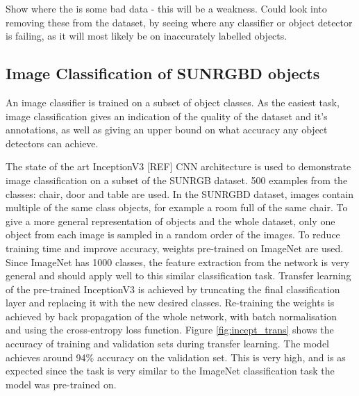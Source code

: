 \documentclass[11pt]{article}
\begin{document}
Show where the is some bad data -  this will be a weakness. Could look into removing these from the dataset, by seeing where any classifier or object detector is failing, as it will most likely be on inaccurately labelled objects.

\subsection*{Image Classification of SUNRGBD objects}
An image classifier is trained on a subset of object classes. As the easiest task, image classification gives an indication of the quality of the dataset and it's annotations, as well as giving an upper bound on what accuracy any object detectors can achieve.

The state of the art InceptionV3 [REF] CNN architecture is used to demonstrate image classification on a subset of the SUNRGB dataset. 500 examples from the classes: chair, door and table are used. In the SUNRGBD dataset, images contain multiple of the same class objects, for example a room full of the same chair. To give a more general representation of objects and the whole dataset, only one object from each image is sampled in a random order of the images. To reduce training time and improve accuracy, weights pre-trained on ImageNet are used. Since ImageNet has 1000 classes, the feature extraction from the network is very general and should apply well to this similar classification task. Transfer learning of the pre-trained InceptionV3 is achieved by truncating the final classification layer and replacing it with the new desired classes. Re-training the weights is achieved by back propagation of the whole network, with batch normalisation and using the cross-entropy loss function. Figure \ref{fig:incept_trans} shows the accuracy of training and validation sets during transfer learning. The model achieves around 94\% accuracy on the validation set. This is very high, and is as expected since the task is very similar to the ImageNet classification task the model was pre-trained on.
\end{document}
